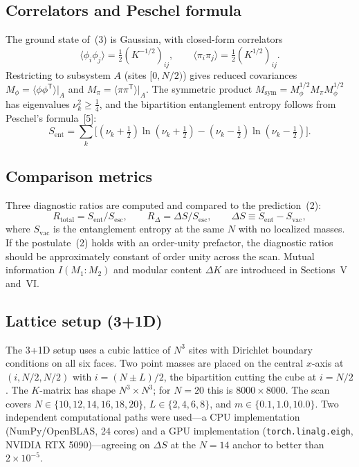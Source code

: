 \documentclass[11pt]{article}
\newcommand{\Sesc}{S_{\mathrm{esc}}}
\newcommand{\Sent}{S_{\mathrm{ent}}}
\newcommand{\Svac}{S_{\mathrm{vac}}}
\newcommand{\Rtot}{R_{\mathrm{total}}}
\begin{document}
\subsection{Correlators and Peschel formula}
The ground state of~(3) is Gaussian, with closed-form correlators
\begin{equation}
  \langle\phi_{i}\phi_{j}\rangle = \tfrac{1}{2}(K^{-1/2})_{ij},
  \qquad
  \langle\pi_{i}\pi_{j}\rangle = \tfrac{1}{2}(K^{1/2})_{ij}.
\end{equation}
Restricting to subsystem $A$ (sites $[0, N/2)$) gives reduced covariances
$M_{\phi} = \langle\phi\phi^{\mathsf{T}}\rangle|_{A}$ and
$M_{\pi} = \langle\pi\pi^{\mathsf{T}}\rangle|_{A}$. The symmetric product
$M_{\mathrm{sym}} = M_{\phi}^{1/2} M_{\pi} M_{\phi}^{1/2}$ has eigenvalues $\nu_{k}^{2} \ge \tfrac{1}{4}$,
and the bipartition entanglement entropy follows from Peschel's formula~[5]:
\begin{equation}
  \Sent = \sum_{k}\bigl[(\nu_{k}+\tfrac{1}{2})\ln(\nu_{k}+\tfrac{1}{2})
  - (\nu_{k}-\tfrac{1}{2})\ln(\nu_{k}-\tfrac{1}{2})\bigr].
\end{equation}

\subsection{Comparison metrics}
Three diagnostic ratios are computed and compared to the prediction~(2):
\begin{equation}
  \Rtot = \Sent/\Sesc,
  \qquad
  R_{\Delta} = \Delta S/\Sesc,
  \qquad
  \Delta S \equiv \Sent - \Svac,
\end{equation}
where $\Svac$ is the entanglement entropy at the same $N$ with no localized masses. If the postulate~(2)
holds with an order-unity prefactor, the diagnostic ratios should be approximately constant of order
unity across the scan. Mutual information $I(M_{1}{:}M_{2})$ and modular content $\Delta K$ are
introduced in Sections~V and~VI.

\subsection{Lattice setup (3+1D)}
The 3+1D setup uses a cubic lattice of $N^{3}$ sites with Dirichlet boundary conditions on all six
faces. Two point masses are placed on the central $x$-axis at $(i, N/2, N/2)$ with $i = (N\pm L)/2$, the
bipartition cutting the cube at $i = N/2$. The $K$-matrix has shape $N^{3}\times N^{3}$; for $N=20$ this
is $8000\times 8000$. The scan covers $N \in \{10,12,14,16,18,20\}$, $L \in \{2,4,6,8\}$, and
$m \in \{0.1, 1.0, 10.0\}$. Two independent computational paths were used---a CPU implementation
(NumPy/OpenBLAS, 24 cores) and a GPU implementation (\texttt{torch.linalg.eigh}, NVIDIA RTX 5090)---agreeing
on $\Delta S$ at the $N=14$ anchor to better than $2\times 10^{-5}$.
\end{document}
